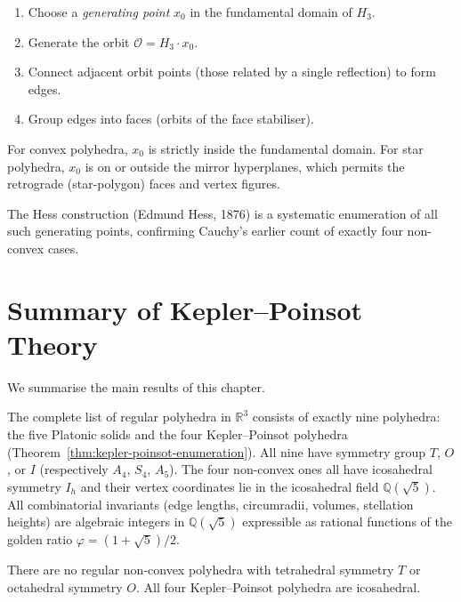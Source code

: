 \begin{enumerate}
  \item Choose a \emph{generating point} $x_0$ in the
        fundamental domain of $H_3$.
  \item Generate the orbit $\mathcal{O} = H_3 \cdot x_0$.
  \item Connect adjacent orbit points (those related by a
        single reflection) to form edges.
  \item Group edges into faces (orbits of the face stabiliser).
\end{enumerate}

For convex polyhedra, $x_0$ is strictly inside the fundamental
domain.  For star polyhedra, $x_0$ is on or outside the
mirror hyperplanes, which permits the retrograde (star-polygon)
faces and vertex figures.

The Hess construction (Edmund Hess, 1876) is a systematic
enumeration of all such generating points, confirming
Cauchy's earlier count of exactly four non-convex cases.

\section{Summary of Kepler--Poinsot Theory}
\label{sec:summary}

We summarise the main results of this chapter.

\begin{theorem}
\label{thm:summary-r3}
The complete list of regular polyhedra in $\mathbb{R}^3$ consists
of exactly nine polyhedra: the five Platonic solids and the four
Kepler–Poinsot polyhedra (Theorem~\ref{thm:kepler-poinsot-enumeration}).
All nine have symmetry group $T$, $O$, or $I$ (respectively
$A_4$, $S_4$, $A_5$).  The four non-convex ones all have
icosahedral symmetry $I_h$ and their vertex coordinates lie in
the icosahedral field $\mathbb{Q}(\sqrt5)$.  All combinatorial
invariants (edge lengths, circumradii, volumes, stellation
heights) are algebraic integers in $\mathbb{Q}(\sqrt5)$
expressible as rational functions of the golden ratio
$\varphi = (1+\sqrt5)/2$.
\end{theorem}

\begin{corollary}
\label{cor:no-octahedral-star}
There are no regular non-convex polyhedra with tetrahedral
symmetry $T$ or octahedral symmetry $O$.  All four
Kepler–Poinsot polyhedra are icosahedral.
\end{corollary}

